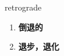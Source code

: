 
\begin{frame}
{\huge retrograde}
\begin{center}
\begin{enumerate}\Large
  \item \textbf{倒退的}
  \item \textbf{退步，退化}
\end{enumerate}
\end{center}
\end{frame}
